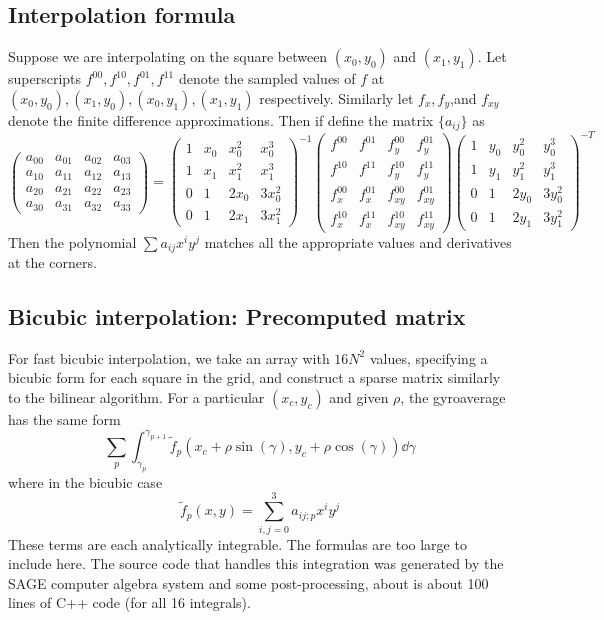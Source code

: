 \subsection{Interpolation formula}
Suppose we are interpolating on the square between $(x_0,y_0)$ and $(x_1,y_1)$.  Let superscripts $f^{00}, f^{10}, f ^{01}, f^{11}$ denote the sampled values of $f$ at $(x_0,y_0), (x_1,y_0), (x_0,y_1), (x_1,y_1)$ respectively.  Similarly let $f_x,f_y$,and $f_{xy}$ denote the finite difference approximations.  Then if define the matrix $ \{a_{ij}\}$ as
\[  \begin{pmatrix}
	a_{00} & a_{01} & a_{02} & a_{03} \\
	a_{10} & a_{11} & a_{12} & a_{13} \\
	a_{20} & a_{21} & a_{22} & a_{23} \\
	a_{30} & a_{31} & a_{32} & a_{33} 
\end{pmatrix}  = 
\begin{pmatrix}
	1 & x_0 & x_0^2 & x_0^3 \\
	1 & x_1 & x_1^2 & x_1^3 \\
0 & 1& 2x_0 &3x_0^2 \\
	0 & 1& 2x_1 &3x_1^2 
\end{pmatrix}^{-1}
\begin{pmatrix}
	f^{00} & f^{01} & f_y^{00} & f_y^{01} \\
	f^{10} & f^{11} & f_y^{10} & f_y^{11} \\
	f_x^{00} & f_x^{01} & f_{xy}^{00} & f_{xy}^{01} \\
	f_x^{10} & f_x^{11} & f_{xy}^{10} & f_{xy}^{11} 
\end{pmatrix}
\begin{pmatrix}
	1 & y_0 & y_0^2 & y_0^3 \\
	1 & y_1 & y_1^2 & y_1^3 \\
	0 & 1& 2y_0 &3y_0^2 \\
	0 & 1& 2y_1 &3y_1^2 
\end{pmatrix}^{-T}
\]
Then the polynomial $\sum a_{ij} x^i y^j$ matches all the appropriate values and derivatives at the corners.
\subsection{Bicubic interpolation: Precomputed matrix}
For fast bicubic interpolation, we take an array with $16N^2$ values, specifying a bicubic form for each square in the grid, and construct a sparse matrix similarly to the bilinear algorithm.  For a particular $(x_c,y_c)$ and given $\rho$, the gyroaverage has the same form \[  \sum_{p}\int_{\gamma_p}^{\gamma_{p+1}} \tilde{f}_p(x_c+\rho \sin(\gamma), y_c + \rho \cos(\gamma)) \dd{\gamma}\]
where in the bicubic case 
\[ \tilde{f}_p(x,y) = \sum_{i,j=0}^3 a_{ij;p} x^i y^j \]
These terms are each analytically integrable.  The formulas are too large to include here. The source code that handles this integration was generated by the SAGE computer algebra system and some post-processing, about is about 100 lines of C++ code (for all 16 integrals).

